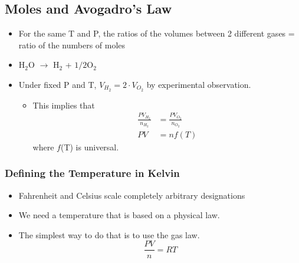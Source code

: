 \documentclass[10pt]{article}
\begin{document}
\subsection*{Moles and Avogadro's Law}
\begin{itemize}
    \item For the same T and P, the ratios of the volumes between 2 different gases = ratio of the numbers of moles
    \item H$_2$O $\rightarrow$ H$_2$ + $1/2$O$_2$
    \item Under fixed P and T, $V_{H_2} = 2 \cdot V_{O_2}$ by experimental observation.
    \begin{itemize}
        \item This implies that 
            \begin{align*}
                \frac{PV_{H_2}}{n_{H_2}} &= \frac{PV_{O_2}}{n_{O_2}}\\
                PV &= nf(T)
            \end{align*}
            where $f$(T) is universal.
    \end{itemize}
\end{itemize}
\subsubsection*{Defining the Temperature in Kelvin}
\begin{itemize}
\item Fahrenheit and Celsius scale completely arbitrary designations
\item We need a temperature that is based on a physical law.
\item The simplest way to do that is to use the gas law.
    \[\frac{PV}{n} = RT\]
\end{itemize}
\end{document}
